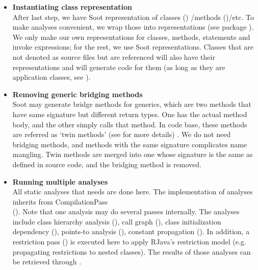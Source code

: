 \documentclass[12pt]{article}
\begin{document}
\begin{enumerate}
\begin{enumerate}
\begin{itemize}
    \item
    \textbf{Instantiating \rjc class representation\\}
    After last step, we have Soot representation of 
    classes ()
    /methods ()/etc. 
    To make analyses convenient, we wrap those into \rjc 
    representations (see package 
    ). 
	We only make our own representations for classes, 
	methods, 	statements and invoke expressions; for the rest,
	we use Soot representations. 
    Classes that are not denoted as source files but are 
    referenced will also have their \rjc representations
    and \rjc will generate code for them (as long as they are
    application classes, see ).

    \item
    \textbf{Removing generic bridging methods\\}
    Soot may generate bridge methods for generics, which are
    two methods that have same signature but different
    return types. One has the actual method body, and the
    other simply calls that method. 
    In \rjc code base, these methods are referred as 
    `twin methods' 
    (see  for more details)
    . We do not need bridging methods, and 
    methods with the same signature complicates name mangling. 
    Twin methods are merged into one whose
    signature is the same as defined in source code, and
    the bridging method is removed. 
    
    \item
    \textbf{Running multiple analyses\\}
    All static analyses that \rjc needs are done here. 
    The implementation of analyses inherits from
    CompilationPass\\ ().
    Note that one analysis may do several passes internally. 
    The analyses include 
    class hierarchy analysis (),
    call graph (), 
    class initialization dependency (),
    points-to analysis (),
    constant propagation (). 
    In addition, a restriction pass ()
    is executed here to apply
    RJava's restriction model (e.g. propagating restrictions
    to nested classes). The results of those analyses 
    can be retrieved through . 
    

\end{itemize}
\end{enumerate}
\end{enumerate}
\end{document}
